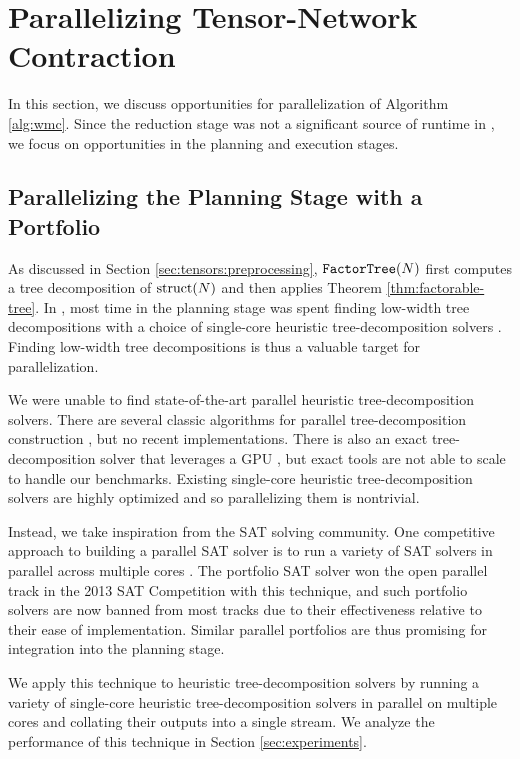 \section{Parallelizing Tensor-Network Contraction}
\label{sec:parallel}

In this section, we discuss opportunities for parallelization of Algorithm \ref{alg:wmc}. Since the reduction stage was not a significant source of runtime in \cite{DDV19}, we focus on opportunities in the planning and execution stages.

\subsection{Parallelizing the Planning Stage with a Portfolio}
\label{sec:parallel:planning}
As discussed in Section \ref{sec:tensors:preprocessing}, $\texttt{\upshape FactorTree}(N)$ first computes a tree decomposition of $\text{struct}(N)$ and then applies Theorem \ref{thm:factorable-tree}. In \cite{DDV19}, most time in the planning stage was spent finding low-width tree decompositions with a choice of single-core heuristic tree-decomposition solvers \cite{AMW17,HS18,Tamaki17}. Finding low-width tree decompositions is thus a valuable target for parallelization.

We were unable to find state-of-the-art parallel heuristic tree-decomposition solvers. There are several classic algorithms for parallel tree-decomposition construction \cite{Lagergren90,SWG13}, but no recent implementations. There is also an exact tree-decomposition solver that leverages a GPU \cite{VB17}, but exact tools are not able to scale to handle our benchmarks. Existing single-core heuristic tree-decomposition solvers are highly optimized and so parallelizing them is nontrivial.

Instead, we take inspiration from the SAT solving community. One competitive approach to building a parallel SAT solver is to run a variety of SAT solvers in parallel across multiple cores \cite{BSS15,MSSS13,XHHL08}. The portfolio SAT solver  \cite{MSSS13} won the open parallel track in the 2013 SAT Competition with this technique, and such portfolio solvers are now banned from most tracks due to their effectiveness relative to their ease of implementation. Similar parallel portfolios are thus promising for integration into the planning stage.

We apply this technique to heuristic tree-decomposition solvers by running a variety of single-core heuristic tree-decomposition solvers in parallel on multiple cores and collating their outputs into a single stream. We analyze the performance of this technique in Section \ref{sec:experiments}.

